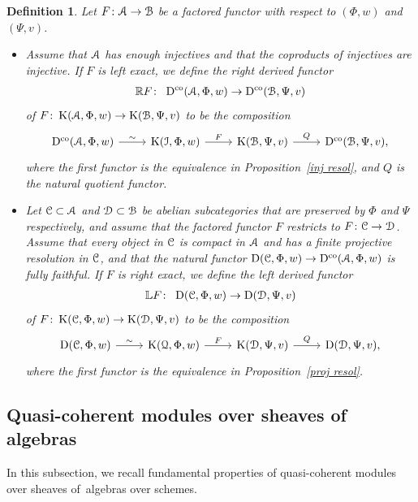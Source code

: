 \documentclass[11pt]{article}
\numberwithin{equation}{section}
\newtheorem{dfn}{Definition}[section]
\numberwithin{equation}{section}
\newcommand{\Dco}{\operatorname{D^{co}}}
\newcommand{\D}{\operatorname{D}}
\newcommand{\K}{\operatorname{K}}
\newcommand{\bL}{\mathbb{L}}
\newcommand{\bR}{\mathbb{R}}
\newcommand{\scrA}{\EuScript{A}}
\newcommand{\scrB}{\EuScript{B}}
\newcommand{\scrC}{\EuScript{C}}
\newcommand{\scrD}{\EuScript{D}}
\newcommand{\scrI}{\EuScript{I}}
\newcommand{\scrQ}{\EuScript{Q}}
\begin{document}
\begin{dfn} Let $F\colon \scrA\to \scrB$ be a factored functor with respect to $(\Phi,w)$ and $(\Psi,v)$.

\begin{itemize}\itemsep=0pt
\item[1.] Assume that $\scrA$ has enough injectives and that the coproducts of injectives are injective.
 If $F$ is left exact, we define the {\it right derived functor}
\begin{gather*}
\bR F\colon\ \Dco(\scrA,\Phi,w)\to \Dco(\scrB,\Psi,v)
\end{gather*}
of $F\colon \K(\scrA,\Phi, w)\to\K(\scrB,\Psi,v)$ to be the composition
\[
\begin{tikzcd}
\Dco(\scrA,\Phi,w)\arrow[r,"\sim"]&\K(\scrI,\Phi,w)\arrow[r,"F"]&\K(\scrB,\Psi,v)\arrow[r,"Q"]&\Dco(\scrB,\Psi,v),
\end{tikzcd}
\]
where the first functor is the equivalence in Proposition~\ref{inj resol}, and $Q$ is the natural quotient functor.

 \item[2.] Let $\scrC\subset \scrA$ and $\scrD\subset \scrB$ be abelian subcategories that are preserved by $\Phi$ and $\Psi$ respectively, and assume that the factored functor $F$ restricts to $F\colon \scrC\to \scrD$. Assume that every object in $\scrC$ is compact in $\scrA$ and has a finite projective resolution in $\scrC$, and that the natural functor $\D(\scrC,\Phi,w)\to \Dco(\scrA,\Phi,w)$ is fully faithful.
If $F$ is right exact, we define the {\it left derived functor}
\begin{gather*}
\bL F\colon\ \D(\scrC,\Phi,w)\to \D(\scrD,\Psi,v)
\end{gather*}
of $F\colon \K(\scrC,\Phi,w)\to \K(\scrD,\Psi,v)$ to be the composition
\[
\begin{tikzcd}
\D(\scrC,\Phi,w)\arrow[r,"\sim"]&\K(\scrQ,\Phi,w)\arrow[r,"F"]&\K(\scrD,\Psi,v)\arrow[r,"Q"]&\D(\scrD,\Psi,v),
\end{tikzcd}
\]
where the first functor is the equivalence in Proposition~\ref{proj resol}.
\end{itemize}
\end{dfn}

\subsection{Quasi-coherent modules over sheaves of algebras}

In this subsection, we recall fundamental properties of quasi-coherent modules over sheaves of~algebras over schemes.
\end{document}
